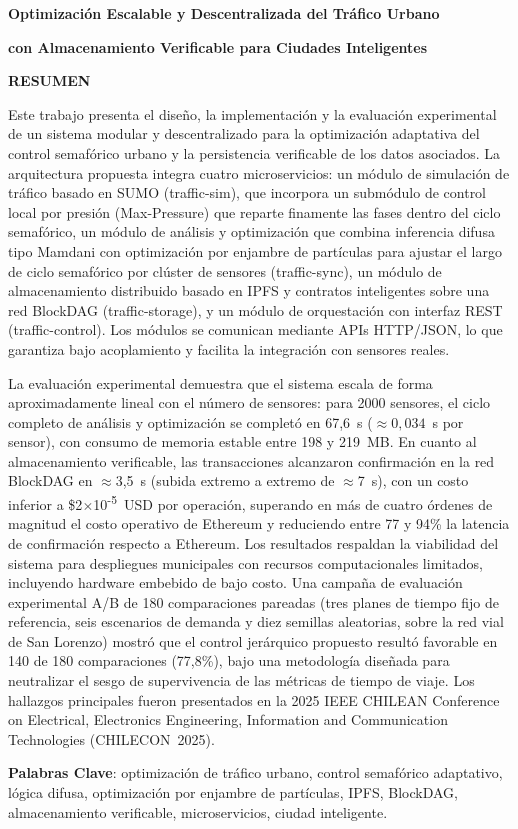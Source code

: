 \centerline{\textbf{\large Optimización Escalable y Descentralizada del Tráfico Urbano}}
\centerline{\textbf{\large con Almacenamiento Verificable para Ciudades Inteligentes}}

\vspace{2cm}

\vspace{0.5cm}

\vspace{0.5cm}

\noindent
\textbf{RESUMEN}

\vspace{0.5cm}

\noindent
Este trabajo presenta el diseño, la implementación y la evaluación experimental de un sistema
modular y descentralizado para la optimización adaptativa del control semafórico urbano y la
persistencia verificable de los datos asociados. La arquitectura propuesta integra cuatro
microservicios: un módulo de simulación de tráfico basado en SUMO (traffic-sim), que incorpora un
submódulo de control local por presión (Max-Pressure) que reparte finamente las fases
dentro del ciclo semafórico,
un módulo de análisis y optimización que combina inferencia difusa tipo Mamdani con
optimización por enjambre de partículas para ajustar el largo de ciclo semafórico por
clúster de sensores (traffic-sync), un módulo de almacenamiento
distribuido basado en IPFS y contratos inteligentes sobre una red BlockDAG
(traffic-storage), y un módulo de orquestación con interfaz REST
(traffic-control). Los módulos se comunican mediante APIs HTTP/JSON,
lo que garantiza bajo acoplamiento y facilita la integración con sensores reales.

La evaluación experimental demuestra que el sistema escala de forma aproximadamente lineal
con el número de sensores: para 2000 sensores, el ciclo completo de análisis y optimización
se completó en 67{,}6~s ($\approx 0{,}034$~s por sensor), con consumo de memoria estable
entre 198 y 219~MB. En cuanto al almacenamiento verificable, las transacciones alcanzaron
confirmación en la red BlockDAG en $\approx$3,5~s (subida extremo a extremo de $\approx$7~s), con un costo inferior a
\$2$\times$10\textsuperscript{-5}~USD por operación, superando en más de cuatro órdenes
de magnitud el costo operativo de Ethereum y reduciendo entre 77 y 94\% la latencia de
confirmación respecto a Ethereum. Los
resultados respaldan la viabilidad del sistema para despliegues municipales con recursos
computacionales limitados, incluyendo hardware embebido de bajo costo. Una campaña de
evaluación experimental A/B de 180 comparaciones pareadas (tres planes de tiempo fijo de
referencia, seis escenarios de demanda y diez semillas aleatorias, sobre la red vial de
San Lorenzo) mostró que el control jerárquico propuesto resultó favorable en 140 de 180
comparaciones (77,8\%), bajo una metodología diseñada para neutralizar el sesgo de
supervivencia de las métricas de tiempo de viaje. Los hallazgos
principales fueron presentados en la 2025 IEEE CHILEAN Conference on Electrical,
Electronics Engineering, Information and Communication Technologies (CHILECON~2025).

\vspace{0.5cm}

\noindent
\textbf{Palabras Clave}: optimización de tráfico urbano, control semafórico adaptativo,
lógica difusa, optimización por enjambre de partículas, IPFS, BlockDAG, almacenamiento
verificable, microservicios, ciudad inteligente.

